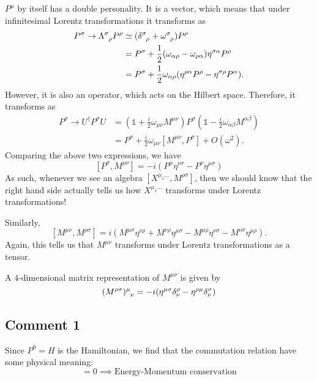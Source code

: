 $P^{\mu}$ by itself has a double personality. It is a vector, which means that under infinitesimal Lorentz transformations it transforms as
\begin{align}
  P^{\sigma} \to \Lambda\indices{^{\sigma}_{\rho}} P^{\rho} &\simeq (\delta\indices{^{\sigma}_{\rho}} + \omega\indices{^{\sigma}_{\rho}}) P^{\rho} \\
  &= P^{\sigma} + \frac{1}{2} (\omega_{\alpha\rho} - \omega_{\rho\alpha}) \eta^{\sigma\alpha} P^{\rho} \\
  &= P^{\sigma} + \frac{1}{2} \omega_{\alpha\rho} (\eta^{\rho\alpha} P^{\rho} - \eta^{\sigma\rho} P^{\alpha}).
\end{align} 
However, it is also an operator, which acts on the Hilbert space.
Therefore, it transforms as
\begin{align}
  P^{\sigma} \to U^{\dagger} P^{\sigma} U &= (\mathbb{1} + \frac{i}{2} \omega_{\mu\nu} M^{\mu\nu}) P^{\sigma} (\mathbb{1} - \frac{i}{2} \omega_{\alpha \beta} M^{\alpha \beta}) \\
					  &= P^{\sigma} +\frac{i}{2} \omega_{\mu\nu} [M^{\mu\nu}, P^{\sigma}] + O(\omega^2).
\end{align}
Comparing the above two expressions, we have
\begin{equation}
  \label{eq:pmcom}
  \boxed{[P^{\sigma}, M^{\mu\nu}] = -i (P^{\mu} \eta^{\nu\sigma} - P^{\nu} \eta^{\mu\sigma})}
\end{equation}
As such, whenever we see an algebra $[X^{\mu_1 \dots}, M^{\rho\sigma}]$, then we should know that the right hand side actually tells us how $X^{\mu_1 \dots}$ transforms under Lorentz transformations!

Similarly, 
\begin{equation}
  \label{eq:mcom}
  \boxed{[M^{\mu\nu}, M^{\rho\sigma}] = i (M^{\mu\sigma} \eta^{\nu\rho} + M^{\nu\rho} \eta^{\mu\sigma} - M^{\mu\rho} \eta^{\nu\sigma} - M^{\nu\sigma} \eta^{\mu\rho})}.
\end{equation}
Again, this tells us that $M^{\mu\nu}$ transforms under Lorentz transformations as a tensor.

\begin{example}[]
  A $4$-dimensional matrix representation of $M^{\mu\nu}$ is given by
  \begin{equation}
    (M^{\rho\sigma})\indices{^{\mu}_{\nu}} = -i (\eta^{\mu\sigma} \delta^{\rho}_{\nu} - \eta^{\rho\mu} \delta^{\sigma}_{\nu})
  \end{equation}
\end{example}

\subsection*{Comment 1}%

Since $P^0 = H$ is the Hamiltonian, we find that the commutation relation have some physical meaning:
\begin{equation}
  [P^0, P^{\mu}] = 0 \implies \text{Energy-Momentum conservation}
\end{equation}
